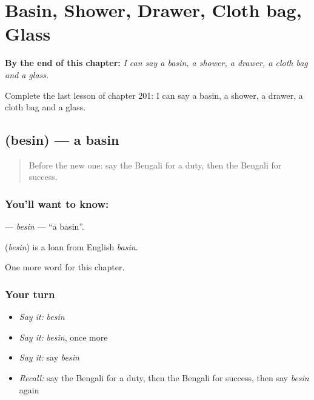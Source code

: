 
\chapter{Basin, Shower, Drawer, Cloth bag, Glass}
\label{ch:bn-basin-shower-drawer-cloth-bag-glass}

\begin{chapteropening}
\textbf{By the end of this chapter:} \emph{I can say a basin, a shower, a drawer, a cloth bag and a glass.}

Complete the last lesson of chapter 201: I can say a basin, a shower, a drawer, a cloth bag and a glass.
\end{chapteropening}

\section[\texorpdfstring{\bn{বেসিন} (besin)}{বেসিন (besin)}]{ (besin) — a basin}

\label{lesson:BN-C201-besin}



\begin{quote}
Before the new one: say the Bengali for a duty, then the Bengali for success.
\end{quote}

\subsection*{You'll want to know: }
\textbf{} — \emph{besin} — \textquotedblleft{}a basin\textquotedblright{}.

\begin{cousinweb}
\textbf{} (\emph{besin}) is a loan from English \emph{basin}.
\end{cousinweb}

\begin{grammarlens}[title={What you've built}]
One more word for this chapter.
\end{grammarlens}

\subsection*{Your turn}
\begin{itemize}
\raggedright
  \item \emph{Say it:} \emph{besin}
  \item \emph{Say it:} \emph{besin}, once more
  \item \emph{Say it:} say \emph{besin}
  \item \emph{Recall:} say the Bengali for a duty, then the Bengali for success, then say \emph{besin} again
\end{itemize}

